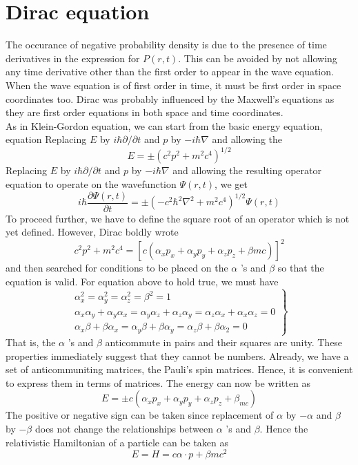  \section{Dirac equation}
 The occurance of negative probability density is due to the presence of time derivatives in the expression for $P(r, t)$. This can be avoided by not allowing any time derivative other than the first order to appear in the wave equation. When the wave equation is of first order in time, it must be first order in space coordinates too. Dirac was probably influenced by the Maxwell's equations as they are first order equations in both space and time coordinates.\\
 As in Klein-Gordon equation, we can start from the basic energy equation, equation 
 Replacing $E$ by $i \hbar \partial / \partial t$ and $p$ by $-i \hbar \nabla$ and allowing the $$E=\pm\left(c^{2} p^{2}+m^{2} c^{4}\right)^{1 / 2}$$
 Replacing $E$ by $i \hbar \partial / \partial t$ and $p$ by $-i \hbar \nabla$ and allowing the resulting operator equation to operate on the wavefunction $\Psi(r, t)$, we get\\
 $$i \hbar \frac{\partial \Psi(r, t)}{\partial t}=\pm\left(-c^{2} \hbar^{2} \nabla^{2}+m^{2} c^{4}\right)^{1 / 2} \Psi(r, t)$$
 To proceed further, we have to define the square root of an operator which is not yet defined. However, Dirac boldly wrote
 $$c^{2} p^{2}+m^{2} c^{4}=\left[c\left(\alpha_{x} p_{x}+\alpha_{y} p_{y}+\alpha_{z} p_{z}+\beta m c\right)\right]^{2}$$
 and then searched for conditions to be placed on the $\alpha$ 's and $\beta$ so that the equation is valid. For equation above to hold true, we must have
$$\left.\begin{array}{r}
	\alpha_{x}^{2}=\alpha_{y}^{2}=\alpha_{z}^{2}=\beta^{2}=1 \\
	\alpha_{x} \alpha_{y}+\alpha_{y} \alpha_{x}=\alpha_{y} \alpha_{z}+\alpha_{z} \alpha_{y}=\alpha_{z} \alpha_{x}+\alpha_{x} \alpha_{z}=0 \\
	\alpha_{x} \beta+\beta \alpha_{x}=\alpha_{y} \beta+\beta \alpha_{y}=\alpha_{z} \beta+\beta \alpha_{2}=0
\end{array}\right\}$$
That is, the $\alpha$ 's and $\beta$ anticommute in pairs and their squares are unity. These properties immediately suggest that they cannot be numbers. Already, we have a set of anticommuniting matrices, the Pauli's spin matrices. Hence, it is convenient to express them in terms of matrices. The energy can now be written as
$$E=\pm c\left(\alpha_{x} p_{x}+\alpha_{y} p_{y}+\alpha_{z} p_{z}+\beta_{m c}\right)$$
The positive or negative sign can be taken since replacement of $\alpha$ by $-\alpha$ and $\beta$ by $-\beta$ does not change the relationships between $\alpha$ 's and $\beta$. Hence the relativistic Hamiltonian of a particle can be taken as $$E=H=c \alpha \cdot p+\beta m c^{2}$$
